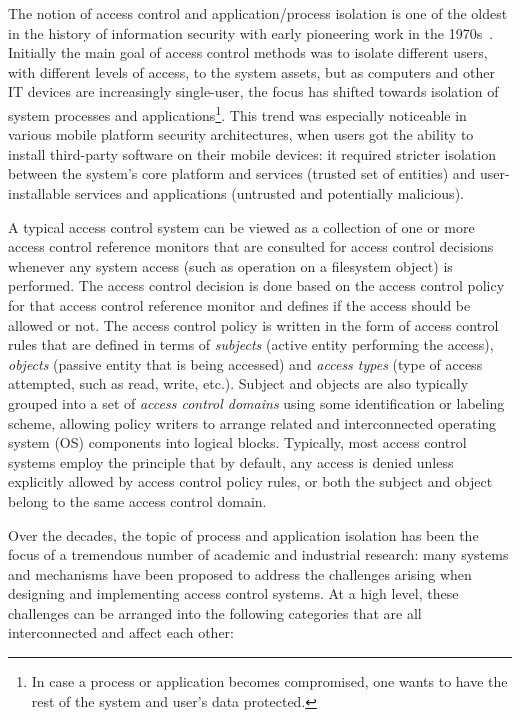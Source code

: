 
The notion of access control and application/process isolation is one of the oldest in the history of information security with early pioneering work in the 1970s~\cite{saltzer75, Denning76}. Initially the main goal of access control methods was to isolate different users, with different levels of access, to the system assets, but as computers and other IT devices are increasingly single-user, the focus has shifted towards isolation of system processes and applications\footnote{In case a process or application becomes compromised, one wants to have the rest of the system and user's data protected.}.
 This trend was especially noticeable in various mobile platform security architectures, when users got the ability to install third-party software on their mobile devices: it required stricter isolation between the system's core platform and services (trusted set of entities) and user-installable services and applications (untrusted and potentially malicious).

A typical access control system can be viewed as a collection of one or more access control reference monitors that are consulted for access control decisions whenever any system access (such as operation on a filesystem object) is performed. The access control decision is done based on the access control policy for that access control reference monitor and defines if the access should be allowed or not. The access control policy is written in the form of access control rules that are defined in terms of \textit{subjects} (active entity performing the access), \textit{objects} (passive entity that is being accessed) and \textit{access types} (type of access attempted, such as read, write, etc.). Subject and objects are also typically grouped into a set of \textit{access control domains} using some identification or labeling scheme, allowing policy writers to arrange related and interconnected operating system (OS) components into logical blocks. Typically, most access control systems employ the principle that by default, any access is denied unless explicitly allowed by access control policy rules, or both the subject and object belong to the same access control domain.
 
Over the decades, the topic of process and application isolation has been the focus of a tremendous number of academic and industrial research: many systems and mechanisms have been proposed to address the challenges arising when designing and implementing access control systems. At a high level, these challenges can be arranged into the following categories that are all interconnected and affect each other: 


